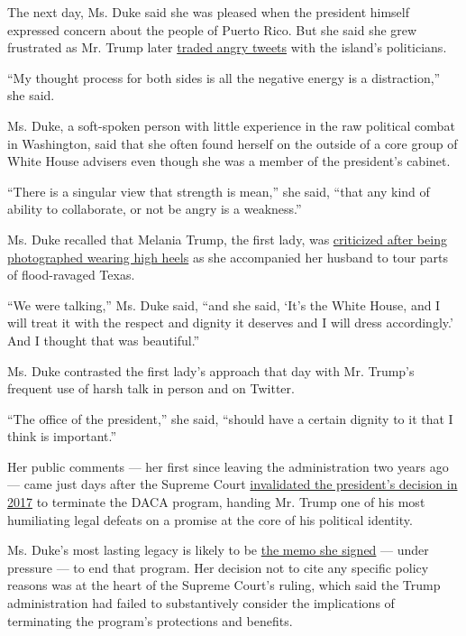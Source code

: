 The next day, Ms. Duke said she was pleased when the president himself
expressed concern about the people of Puerto Rico. But she said she grew
frustrated as Mr. Trump later
\href{https://www.nytimes.com/2017/09/30/us/politics/trump-puerto-rico-mayor.html}{traded
angry tweets} with the island's politicians.

``My thought process for both sides is all the negative energy is a
distraction,'' she said.

Ms. Duke, a soft-spoken person with little experience in the raw
political combat in Washington, said that she often found herself on the
outside of a core group of White House advisers even though she was a
member of the president's cabinet.

``There is a singular view that strength is mean,'' she said, ``that any
kind of ability to collaborate, or not be angry is a weakness.''

Ms. Duke recalled that Melania Trump, the first lady, was
\href{https://www.nytimes.com/2017/08/29/fashion/melania-trump-hurricane-harvey-heels-texas.html}{criticized
after being photographed wearing high heels} as she accompanied her
husband to tour parts of flood-ravaged Texas.

``We were talking,'' Ms. Duke said, ``and she said, `It's the White
House, and I will treat it with the respect and dignity it deserves and
I will dress accordingly.' And I thought that was beautiful.''

Ms. Duke contrasted the first lady's approach that day with Mr. Trump's
frequent use of harsh talk in person and on Twitter.

``The office of the president,'' she said, ``should have a certain
dignity to it that I think is important.''

Her public comments --- her first since leaving the administration two
years ago --- came just days after the Supreme Court
\href{https://www.nytimes.com/2020/06/18/us/trump-daca-supreme-court.html}{invalidated
the president's decision in 2017} to terminate the DACA program, handing
Mr. Trump one of his most humiliating legal defeats on a promise at the
core of his political identity.

Ms. Duke's most lasting legacy is likely to be
\href{https://www.nytimes.com/2019/11/11/us/politics/supreme-court-dreamers-case.html}{the
memo she signed} --- under pressure --- to end that program. Her
decision not to cite any specific policy reasons was at the heart of the
Supreme Court's ruling, which said the Trump administration had failed
to substantively consider the implications of terminating the program's
protections and benefits.


